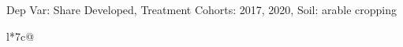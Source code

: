 \begin{table}[H]
\captionlistentry[table]{}
\label{table:beaver_land_class_DVis_land_class_3_SCg23_SSAC}
\scriptsize %
Dep Var: Share Developed, Treatment Cohorts: 2017, 2020, Soil: arable cropping \\
\begin{threeparttable}
\begin{tabulary}{\textwidth}{l*{7}{c}@{}}
\toprule \toprule
\noalign{\smallskip}
\noalign{\smallskip}
\midrule \bottomrule
\end{tabulary}
\medskip
\end{threeparttable}
\end{table}
